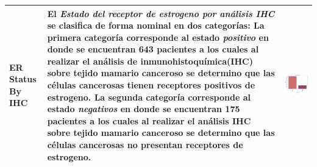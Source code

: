 \begin{table}[!htb]
\begin{threeparttable}
\begin{tabular}{p{2.5cm} p{7cm} p{6.5cm}}
			ER Status By IHC
			&El \textit{Estado del receptor de estrogeno por análisis IHC} se clasifica de forma nominal en dos categorías: La primera categoría corresponde al estado \textit{positivo} en donde se encuentran 643 pacientes a los cuales al realizar el análisis de inmunohistoquímica(IHC) sobre tejido mamario canceroso se determino que las células cancerosas tienen receptores positivos de estrogeno. La segunda categoría corresponde al estado \textit{negativos} en donde se encuentran 175 pacientes a los cuales al realizar el análisis IHC sobre tejido mamario canceroso se determino que las células cancerosas no presentan receptores de estrogeno.
			& \begin{center}\includegraphics[width=1\linewidth]{NOTEBOOK/IMAGENES_DESCRIPTIVAS/11_er_status_ihc}\end{center}
			\\ \hline
			
			
		\end{tabular}
	\end{threeparttable}
\end{table}

